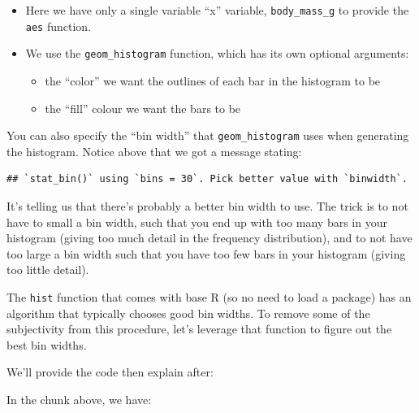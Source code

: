 \documentclass[
]{book}
\newenvironment{Shaded}{\begin{snugshade}}{\end{snugshade}}
\newcommand{\AttributeTok}[1]{\textcolor[rgb]{0.13,0.29,0.53}{#1}}
\newcommand{\ConstantTok}[1]{\textcolor[rgb]{0.56,0.35,0.01}{#1}}
\newcommand{\FunctionTok}[1]{\textcolor[rgb]{0.13,0.29,0.53}{\textbf{#1}}}
\newcommand{\NormalTok}[1]{#1}
\newcommand{\OtherTok}[1]{\textcolor[rgb]{0.56,0.35,0.01}{#1}}
\newcommand{\SpecialCharTok}[1]{\textcolor[rgb]{0.81,0.36,0.00}{\textbf{#1}}}
\providecommand{\tightlist}{%
  \setlength{\itemsep}{0pt}\setlength{\parskip}{0pt}}
\begin{document}
\begin{itemize}
\tightlist
\item
  Here we have only a single variable ``x'' variable, \texttt{body\_mass\_g} to provide the \texttt{aes} function.
\item
  We use the \texttt{geom\_histogram} function, which has its own optional arguments:

  \begin{itemize}
  \tightlist
  \item
    the ``color'' we want the outlines of each bar in the histogram to be
  \item
    the ``fill'' colour we want the bars to be
  \end{itemize}
\end{itemize}

You can also specify the ``bin width'' that \texttt{geom\_histogram} uses when generating the histogram. Notice above that we got a message stating:

\begin{verbatim}
## `stat_bin()` using `bins = 30`. Pick better value with `binwidth`.
\end{verbatim}

It's telling us that there's probably a better bin width to use. The trick is to not have to small a bin width, such that you end up with too many bars in your histogram (giving too much detail in the frequency distribution), and to not have too large a bin width such that you have too few bars in your histogram (giving too little detail).

The \texttt{hist} function that comes with base R (so no need to load a package) has an algorithm that typically chooses good bin widths. To remove some of the subjectivity from this procedure, let's leverage that function to figure out the best bin widths.

We'll provide the code then explain after:

\begin{Shaded}
\end{Shaded}

In the chunk above, we have:
\end{document}
